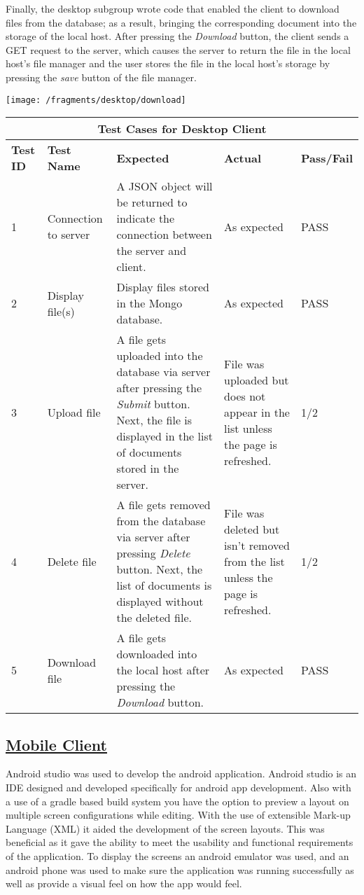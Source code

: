 \documentclass{article}
\begin{document}
Finally, the desktop subgroup wrote code that enabled the client to download files from the database; as a result, bringing the corresponding document into the storage of the local host. After pressing the \textit{Download} button, the client sends a GET request to the server, which causes the server to return the file in the local host's file manager and the user stores the file in the local host's storage by pressing the \textit{save} button of the file manager.

\texttt{[image: /fragments/desktop/download]}

\begin{tabular}{|p{2cm}|p{2cm}|p{3cm}|p{3cm}|p{3cm}|}
\hline
\multicolumn{5}{|c|}{\textbf{Test Cases for Desktop Client}} \\
\hline
\textbf{Test ID} & \textbf{Test Name} & \textbf{Expected} & \textbf{Actual} & \textbf{Pass/Fail} \\
\hline
1 & Connection to server & A JSON object will be returned to indicate the connection between the server and client.  & As expected & PASS \\
\hline
2 & Display file(s) & Display files stored in the Mongo database. & As expected & PASS \\
\hline
3 & Upload file & A file gets uploaded into the database via server after pressing the \textit{Submit} button. Next, the file is displayed in the list of documents stored in the server. & File was uploaded but does not appear in the list unless the page is refreshed. & 1/2 \\
\hline
4 & Delete file & A file gets removed from the database via server after pressing \textit{Delete} button. Next, the list of documents is displayed without the deleted file. & File was deleted but isn't removed from the list unless the page is refreshed. & 1/2 \\
\hline
5 & Download file & A file gets downloaded into the local host after pressing the \textit{Download} button. & As expected & PASS \\
\hline
\end{tabular}

\subsection{\underline{Mobile Client}}
Android studio was used to develop the android application. Android studio is an IDE designed and developed specifically for android app development. Also with a use of a gradle based build system you have the option to preview a layout on multiple screen configurations while editing. With the use of extensible Mark-up Language (XML) it aided the development of the screen layouts. This was beneficial as it gave the ability to meet the usability and functional requirements of the application. To display the screens an android emulator was used, and an android phone was used to make sure the application was running successfully as well as provide a visual feel on how the app would feel.
\end{document}
